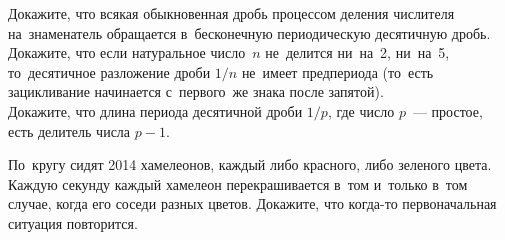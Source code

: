 \begin{problems}
\item
\sp
Докажите, что всякая обыкновенная дробь процессом деления числителя
на~знаменатель обращается в~бесконечную периодическую десятичную дробь.
\\
\sp
Докажите, что если натуральное число~$n$ не~делится ни~на~2, ни~на~5,
то~десятичное разложение дроби $1/n$ не~имеет предпериода
(то~есть зацикливание начинается с~первого~же знака после запятой).
\\
\sp
Докажите, что длина периода десятичной дроби $1 / p$, где число $p$~---
простое, есть делитель числа $p - 1$.

\item
По~кругу сидят 2014 хамелеонов, каждый либо красного, либо зеленого цвета.
Каждую секунду каждый хамелеон перекрашивается в~том и~только в~том случае,
когда его соседи разных цветов.
Докажите, что когда-то первоначальная ситуация повторится.

\end{problems}

